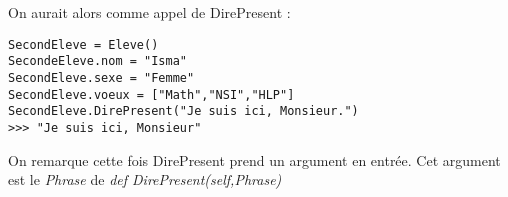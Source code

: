 \documentclass[12pt,fleqn]{report} %
\begin{document}
On aurait alors comme appel de DirePresent : 
\begin{center}
	\begin{varwidth}[t]{.5\textwidth}
		\begin{lstlisting}[language=iPython,linewidth = 12cm]
SecondEleve = Eleve()
SecondeEleve.nom = "Isma"
SecondEleve.sexe = "Femme"
SecondEleve.voeux = ["Math","NSI","HLP"]
SecondEleve.DirePresent("Je suis ici, Monsieur.")
>>> "Je suis ici, Monsieur"\end{lstlisting}
\end{varwidth}\end{center}

On remarque cette fois DirePresent prend un argument en entrée. Cet argument est le \textit{Phrase} de \textit{def DirePresent(self,Phrase)}


%
\end{document}
